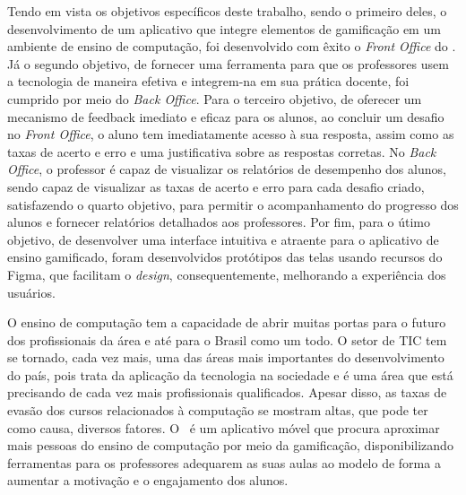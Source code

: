 
Tendo em vista os objetivos específicos deste trabalho, sendo o primeiro deles, o desenvolvimento de um aplicativo que integre elementos de gamificação em um ambiente de ensino de computação, foi desenvolvido com êxito o \textit{Front Office} do \appName. Já o segundo objetivo, de fornecer uma ferramenta para que os professores usem a tecnologia de maneira efetiva e integrem-na em sua prática docente, foi cumprido por meio do \textit{Back Office}. Para o terceiro objetivo, de oferecer um mecanismo de feedback imediato e eficaz para os alunos, ao concluir um desafio no \textit{Front Office}, o aluno tem imediatamente acesso à sua resposta, assim como as taxas de acerto e erro e uma justificativa sobre as respostas corretas. No \textit{Back Office}, o professor é capaz de visualizar os relatórios de desempenho dos alunos, sendo capaz de visualizar as taxas de acerto e erro para cada desafio criado, satisfazendo o quarto objetivo, para permitir o acompanhamento do progresso dos alunos e fornecer relatórios detalhados aos professores. Por fim, para o útimo objetivo, de desenvolver uma interface intuitiva e atraente para o aplicativo de ensino gamificado, foram desenvolvidos protótipos das telas usando recursos do Figma, que facilitam o \textit{design}, consequentemente, melhorando a experiência dos usuários.

O ensino de computação tem a capacidade de abrir muitas portas para o futuro dos profissionais da área e até para o Brasil como um todo. O setor de TIC tem se tornado, cada vez mais, uma das áreas mais importantes do desenvolvimento do país, pois trata da aplicação da tecnologia na sociedade e é uma área que está precisando de cada vez mais profissionais qualificados. Apesar disso, as taxas de evasão dos cursos relacionados à computação se mostram altas, que pode ter como causa, diversos fatores. O \appName\ é um aplicativo móvel que procura aproximar mais pessoas do ensino de computação por meio da gamificação, disponibilizando ferramentas para os professores adequarem as suas aulas ao modelo de forma a aumentar a motivação e o engajamento dos alunos.

